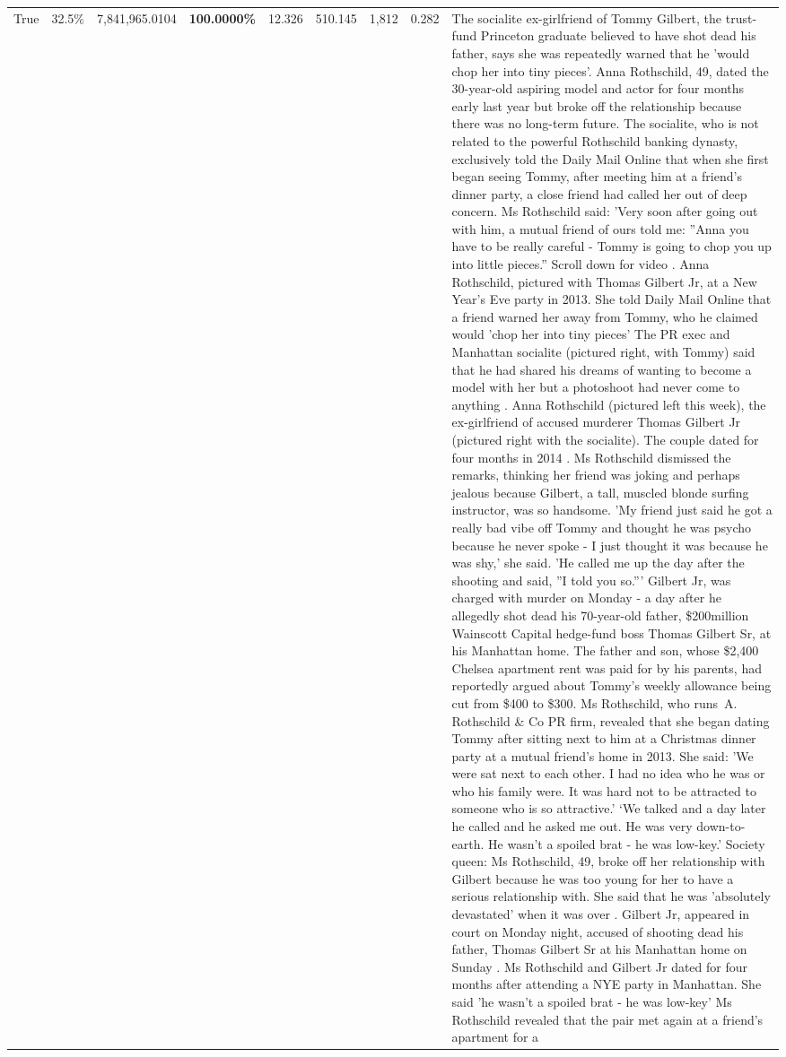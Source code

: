 \begin{table}[H]
\begin{tabular}{lllrlllll}
True & 32.5\% & 7,841,965.0104 & \bfseries \color{red} 100.0000\% & 12.326 & 510.145 & 1,812 & 0.282 & The socialite ex-girlfriend of Tommy Gilbert, the trust-fund Princeton graduate believed to have shot dead his father, says she was repeatedly warned that he 'would chop her into tiny pieces'. Anna Rothschild, 49, dated the 30-year-old aspiring model and actor for four months early last year but broke off the relationship because there was no long-term future. The socialite, who is not related to the powerful Rothschild banking dynasty, exclusively told the Daily Mail Online that when she first began seeing Tommy, after meeting him at a friend's dinner party, a close friend had called her out of deep concern. Ms Rothschild said: 'Very soon after going out with him, a mutual friend of ours told me: ''Anna you have to be really careful - Tommy is going to chop you up into little pieces.'' Scroll down for video . Anna Rothschild, pictured with Thomas Gilbert Jr, at a New Year's Eve party in 2013. She told Daily Mail Online that a friend warned her away from Tommy, who he claimed would 'chop her into tiny pieces' The PR exec and Manhattan socialite (pictured right, with Tommy) said that he had shared his dreams of wanting to become a model with her but a photoshoot had never come to anything . Anna Rothschild (pictured left this week), the ex-girlfriend of accused murderer Thomas Gilbert Jr (pictured right with the socialite). The couple dated for four months in 2014 . Ms Rothschild dismissed the remarks, thinking her friend was joking and perhaps jealous because Gilbert, a tall, muscled blonde surfing instructor, was so handsome. 'My friend just said he got a really bad vibe off Tommy and thought he was psycho because he never spoke - I just thought it was because he was shy,' she said. 'He called me up the day after the shooting and said, ''I told you so.''' Gilbert Jr, was charged with murder on Monday - a day after he allegedly shot dead his 70-year-old father, \$200million Wainscott Capital hedge-fund boss Thomas Gilbert Sr, at his Manhattan home. The father and son, whose \$2,400 Chelsea apartment rent was paid for by his parents, had reportedly argued about Tommy's weekly allowance being cut from \$400 to \$300. Ms Rothschild, who runs A. Rothschild \& Co PR firm, revealed that she began dating Tommy after sitting next to him at a Christmas dinner party at a mutual friend's home in 2013. She said: 'We were sat next to each other. I had no idea who he was or who his family were. It was hard not to be attracted to someone who is so attractive.' ‘We talked and a day later he called and he asked me out. He was very down-to-earth. He wasn’t a spoiled brat - he was low-key.’ Society queen: Ms Rothschild, 49, broke off her relationship with Gilbert because he was too young for her to have a serious relationship with. She said that he was 'absolutely devastated' when it was over . Gilbert Jr, appeared in court on Monday night, accused of shooting dead his father, Thomas Gilbert Sr at his Manhattan home on Sunday . Ms Rothschild and Gilbert Jr dated for four months after attending a NYE party in Manhattan. She said 'he wasn't a spoiled brat - he was low-key' Ms Rothschild revealed that the pair met again at a friend’s apartment for a 
\end{tabular}
\end{table}
